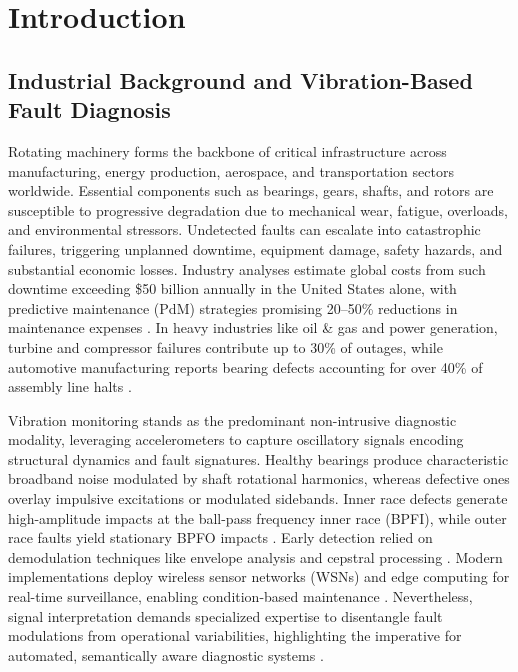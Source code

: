 \section{Introduction}

\subsection{Industrial Background and Vibration-Based Fault Diagnosis}

Rotating machinery forms the backbone of critical infrastructure across manufacturing, energy production, aerospace, and transportation sectors worldwide. Essential components such as bearings, gears, shafts, and rotors are susceptible to progressive degradation due to mechanical wear, fatigue, overloads, and environmental stressors. Undetected faults can escalate into catastrophic failures, triggering unplanned downtime, equipment damage, safety hazards, and substantial economic losses. Industry analyses estimate global costs from such downtime exceeding \$50 billion annually in the United States alone, with predictive maintenance (PdM) strategies promising 20--50\% reductions in maintenance expenses \cite{cite1}\cite{cite22}. In heavy industries like oil \& gas and power generation, turbine and compressor failures contribute up to 30\% of outages, while automotive manufacturing reports bearing defects accounting for over 40\% of assembly line halts \cite{cite23}.

Vibration monitoring stands as the predominant non-intrusive diagnostic modality, leveraging accelerometers to capture oscillatory signals encoding structural dynamics and fault signatures. Healthy bearings produce characteristic broadband noise modulated by shaft rotational harmonics, whereas defective ones overlay impulsive excitations or modulated sidebands. Inner race defects generate high-amplitude impacts at the ball-pass frequency inner race (BPFI), while outer race faults yield stationary BPFO impacts \cite{cite2}. Early detection relied on demodulation techniques like envelope analysis and cepstral processing \cite{cite3}\cite{randall2011vibration}. Modern implementations deploy wireless sensor networks (WSNs) and edge computing for real-time surveillance, enabling condition-based maintenance \cite{lei2018review}. Nevertheless, signal interpretation demands specialized expertise to disentangle fault modulations from operational variabilities, highlighting the imperative for automated, semantically aware diagnostic systems \cite{cite4}\cite{cite24}.

